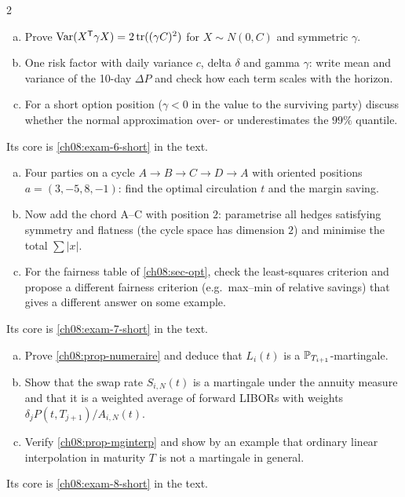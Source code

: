 \begin{paracol}{2}
\begin{exercise}\label{ch08:exam-6}
\leavevmode
\begin{enumerate}[(a)]
  \item Prove $\operatorname{Var}(X^{\mathsf T}\gamma X)=2\operatorname{tr}((\gamma C)^2)$ for $X\sim N(0,C)$ and symmetric $\gamma$.
  \item One risk factor with
      daily variance $c$, delta $\delta$ and gamma $\gamma$: write mean and variance of the 10-day $\Delta P$ and check how each
      term scales with the horizon.
  \item For a short option position ($\gamma<0$ in the value to the surviving party) discuss
      whether the normal approximation over- or underestimates the $99\%$ quantile.
\end{enumerate}
Its core is \cref{ch08:exam-6-short} in the text.
\end{exercise}

\begin{exercise}\label{ch08:exam-7}
\leavevmode
\begin{enumerate}[(a)]
  \item Four parties on a cycle $A\to B\to C\to D\to A$ with oriented positions $a=(3,-5,8,-1)$: find the optimal
      circulation $t$ and the margin saving.
  \item Now add the chord A--C with position $2$: parametrise all hedges satisfying
      symmetry and flatness (the cycle space has dimension $2$) and minimise the total $\sum|x|$.
  \item For the fairness table
      of \cref{ch08:sec-opt}, check the least-squares criterion and propose a different fairness criterion (e.g.\ max--min
      of relative savings) that gives a different answer on some example.
\end{enumerate}
Its core is \cref{ch08:exam-7-short} in the text.
\end{exercise}

\begin{exercise}\label{ch08:exam-8}
\leavevmode
\begin{enumerate}[(a)]
  \item Prove \cref{ch08:prop-numeraire} and deduce that $L_i(t)$ is a $\mathbb{P}_{T_{i+1}}$-martingale.
  \item Show that the swap
      rate $S_{i,N}(t)$ is a martingale under the annuity measure and that it is a weighted average of forward LIBORs with
      weights $\delta_jP(t,T_{j+1})/A_{i,N}(t)$.
  \item Verify \cref{ch08:prop-mginterp} and show by an example that ordinary
      linear interpolation in maturity $T$ is not a martingale in general.
\end{enumerate}
Its core is \cref{ch08:exam-8-short} in the text.
\end{exercise}


\end{paracol}
